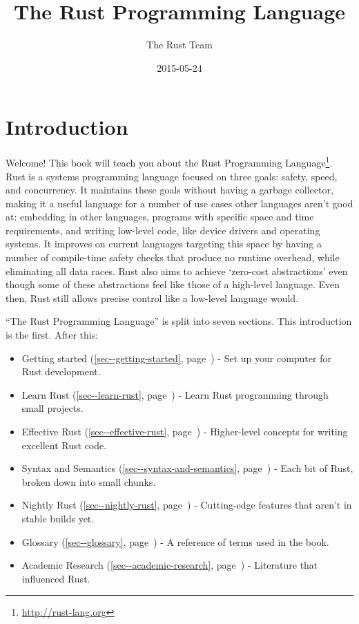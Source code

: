 \documentclass[a4paper,]{book}
\title{The Rust Programming Language}
\author{The Rust Team}
\date{2015-05-24}
\renewcommand*{\hyperref}[2][\ar]{%
  \def\ar{#2}%
  #2 (\autoref{#1}, page~\pageref{#1})}
\renewcommand{\href}[2]{#2\footnote{\url{#1}}}
\begin{document}
  \maketitle



{
  \hypersetup{linkcolor=black}
  \setcounter{tocdepth}{2}
  \tableofcontents
  \newpage
}

\chapter{Introduction}\label{introduction}

Welcome! This book will teach you about the
\href{http://rust-lang.org}{Rust Programming Language}. Rust is a
systems programming language focused on three goals: safety, speed, and
concurrency. It maintains these goals without having a garbage
collector, making it a useful language for a number of use cases other
languages aren't good at: embedding in other languages, programs with
specific space and time requirements, and writing low-level code, like
device drivers and operating systems. It improves on current languages
targeting this space by having a number of compile-time safety checks
that produce no runtime overhead, while eliminating all data races. Rust
also aims to achieve `zero-cost abstractions' even though some of these
abstractions feel like those of a high-level language. Even then, Rust
still allows precise control like a low-level language would.

``The Rust Programming Language'' is split into seven sections. This
introduction is the first. After this:

\begin{itemize}
\itemsep1pt\parskip0pt
\item
  \hyperref[sec--getting-started]{Getting started} - Set up your
  computer for Rust development.
\item
  \hyperref[sec--learn-rust]{Learn Rust} - Learn Rust programming
  through small projects.
\item
  \hyperref[sec--effective-rust]{Effective Rust} - Higher-level concepts
  for writing excellent Rust code.
\item
  \hyperref[sec--syntax-and-semantics]{Syntax and Semantics} - Each bit
  of Rust, broken down into small chunks.
\item
  \hyperref[sec--nightly-rust]{Nightly Rust} - Cutting-edge features
  that aren't in stable builds yet.
\item
  \hyperref[sec--glossary]{Glossary} - A reference of terms used in the
  book.
\item
  \hyperref[sec--academic-research]{Academic Research} - Literature that
  influenced Rust.
\end{itemize}
\end{document}
